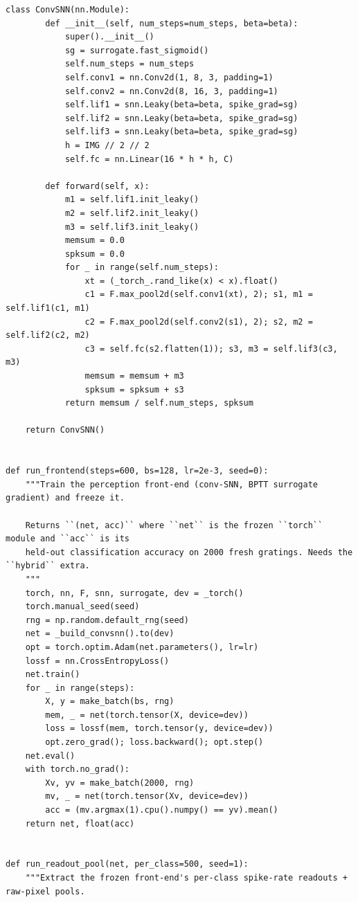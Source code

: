 \begin{lstlisting}[caption={mrl\_trace/hybrid.py},label={lst:siox-src-hybrid}]
    class ConvSNN(nn.Module):
        def __init__(self, num_steps=num_steps, beta=beta):
            super().__init__()
            sg = surrogate.fast_sigmoid()
            self.num_steps = num_steps
            self.conv1 = nn.Conv2d(1, 8, 3, padding=1)
            self.conv2 = nn.Conv2d(8, 16, 3, padding=1)
            self.lif1 = snn.Leaky(beta=beta, spike_grad=sg)
            self.lif2 = snn.Leaky(beta=beta, spike_grad=sg)
            self.lif3 = snn.Leaky(beta=beta, spike_grad=sg)
            h = IMG // 2 // 2
            self.fc = nn.Linear(16 * h * h, C)

        def forward(self, x):
            m1 = self.lif1.init_leaky()
            m2 = self.lif2.init_leaky()
            m3 = self.lif3.init_leaky()
            memsum = 0.0
            spksum = 0.0
            for _ in range(self.num_steps):
                xt = (_torch_.rand_like(x) < x).float()
                c1 = F.max_pool2d(self.conv1(xt), 2); s1, m1 = self.lif1(c1, m1)
                c2 = F.max_pool2d(self.conv2(s1), 2); s2, m2 = self.lif2(c2, m2)
                c3 = self.fc(s2.flatten(1)); s3, m3 = self.lif3(c3, m3)
                memsum = memsum + m3
                spksum = spksum + s3
            return memsum / self.num_steps, spksum

    return ConvSNN()


def run_frontend(steps=600, bs=128, lr=2e-3, seed=0):
    """Train the perception front-end (conv-SNN, BPTT surrogate gradient) and freeze it.

    Returns ``(net, acc)`` where ``net`` is the frozen ``torch`` module and ``acc`` is its
    held-out classification accuracy on 2000 fresh gratings. Needs the ``hybrid`` extra.
    """
    torch, nn, F, snn, surrogate, dev = _torch()
    torch.manual_seed(seed)
    rng = np.random.default_rng(seed)
    net = _build_convsnn().to(dev)
    opt = torch.optim.Adam(net.parameters(), lr=lr)
    lossf = nn.CrossEntropyLoss()
    net.train()
    for _ in range(steps):
        X, y = make_batch(bs, rng)
        mem, _ = net(torch.tensor(X, device=dev))
        loss = lossf(mem, torch.tensor(y, device=dev))
        opt.zero_grad(); loss.backward(); opt.step()
    net.eval()
    with torch.no_grad():
        Xv, yv = make_batch(2000, rng)
        mv, _ = net(torch.tensor(Xv, device=dev))
        acc = (mv.argmax(1).cpu().numpy() == yv).mean()
    return net, float(acc)


def run_readout_pool(net, per_class=500, seed=1):
    """Extract the frozen front-end's per-class spike-rate readouts + raw-pixel pools.


\end{lstlisting}
